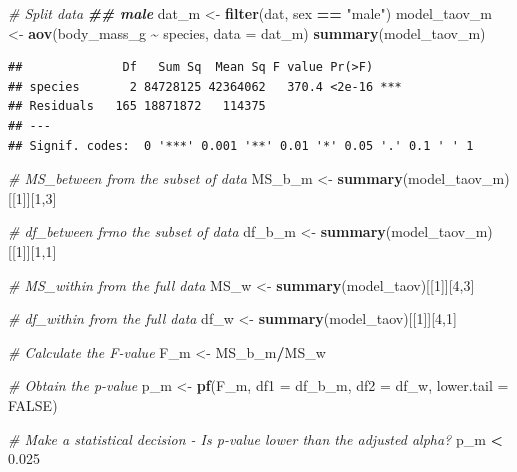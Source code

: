 \documentclass[
]{book}
\newenvironment{Shaded}{\begin{snugshade}}{\end{snugshade}}
\newcommand{\AttributeTok}[1]{\textcolor[rgb]{0.13,0.29,0.53}{#1}}
\newcommand{\CommentTok}[1]{\textcolor[rgb]{0.56,0.35,0.01}{\textit{#1}}}
\newcommand{\ConstantTok}[1]{\textcolor[rgb]{0.56,0.35,0.01}{#1}}
\newcommand{\DecValTok}[1]{\textcolor[rgb]{0.00,0.00,0.81}{#1}}
\newcommand{\DocumentationTok}[1]{\textcolor[rgb]{0.56,0.35,0.01}{\textbf{\textit{#1}}}}
\newcommand{\FloatTok}[1]{\textcolor[rgb]{0.00,0.00,0.81}{#1}}
\newcommand{\FunctionTok}[1]{\textcolor[rgb]{0.13,0.29,0.53}{\textbf{#1}}}
\newcommand{\NormalTok}[1]{#1}
\newcommand{\OtherTok}[1]{\textcolor[rgb]{0.56,0.35,0.01}{#1}}
\newcommand{\SpecialCharTok}[1]{\textcolor[rgb]{0.81,0.36,0.00}{\textbf{#1}}}
\newcommand{\StringTok}[1]{\textcolor[rgb]{0.31,0.60,0.02}{#1}}
\begin{document}
\begin{Shaded}
\begin{Highlighting}[]
\CommentTok{\# Split data}
\DocumentationTok{\#\# male}
\NormalTok{dat\_m }\OtherTok{\textless{}{-}} \FunctionTok{filter}\NormalTok{(dat, sex }\SpecialCharTok{==} \StringTok{"male"}\NormalTok{)}
\NormalTok{model\_taov\_m }\OtherTok{\textless{}{-}} \FunctionTok{aov}\NormalTok{(body\_mass\_g }\SpecialCharTok{\textasciitilde{}}\NormalTok{ species, }\AttributeTok{data =}\NormalTok{ dat\_m)}
\FunctionTok{summary}\NormalTok{(model\_taov\_m)}
\end{Highlighting}
\end{Shaded}

\begin{verbatim}
##              Df   Sum Sq  Mean Sq F value Pr(>F)    
## species       2 84728125 42364062   370.4 <2e-16 ***
## Residuals   165 18871872   114375                   
## ---
## Signif. codes:  0 '***' 0.001 '**' 0.01 '*' 0.05 '.' 0.1 ' ' 1
\end{verbatim}

\begin{Shaded}
\begin{Highlighting}[]
\CommentTok{\# MS\_between from the subset of data}
\NormalTok{MS\_b\_m }\OtherTok{\textless{}{-}} \FunctionTok{summary}\NormalTok{(model\_taov\_m)[[}\DecValTok{1}\NormalTok{]][}\DecValTok{1}\NormalTok{,}\DecValTok{3}\NormalTok{]}

\CommentTok{\# df\_between frmo the subset of data}
\NormalTok{df\_b\_m }\OtherTok{\textless{}{-}} \FunctionTok{summary}\NormalTok{(model\_taov\_m)[[}\DecValTok{1}\NormalTok{]][}\DecValTok{1}\NormalTok{,}\DecValTok{1}\NormalTok{]}

\CommentTok{\# MS\_within from the full data}
\NormalTok{MS\_w }\OtherTok{\textless{}{-}} \FunctionTok{summary}\NormalTok{(model\_taov)[[}\DecValTok{1}\NormalTok{]][}\DecValTok{4}\NormalTok{,}\DecValTok{3}\NormalTok{]}

\CommentTok{\# df\_within from the full data}
\NormalTok{df\_w }\OtherTok{\textless{}{-}} \FunctionTok{summary}\NormalTok{(model\_taov)[[}\DecValTok{1}\NormalTok{]][}\DecValTok{4}\NormalTok{,}\DecValTok{1}\NormalTok{]}

\CommentTok{\# Calculate the F{-}value}
\NormalTok{F\_m }\OtherTok{\textless{}{-}}\NormalTok{ MS\_b\_m}\SpecialCharTok{/}\NormalTok{MS\_w}

\CommentTok{\# Obtain the p{-}value}
\NormalTok{p\_m }\OtherTok{\textless{}{-}} \FunctionTok{pf}\NormalTok{(F\_m, }\AttributeTok{df1 =}\NormalTok{ df\_b\_m, }\AttributeTok{df2 =}\NormalTok{ df\_w, }\AttributeTok{lower.tail =} \ConstantTok{FALSE}\NormalTok{)}

\CommentTok{\# Make a statistical decision {-} Is p{-}value lower than the adjusted alpha?}
\NormalTok{p\_m }\SpecialCharTok{\textless{}} \FloatTok{0.025}
\end{Highlighting}
\end{Shaded}
\end{document}
